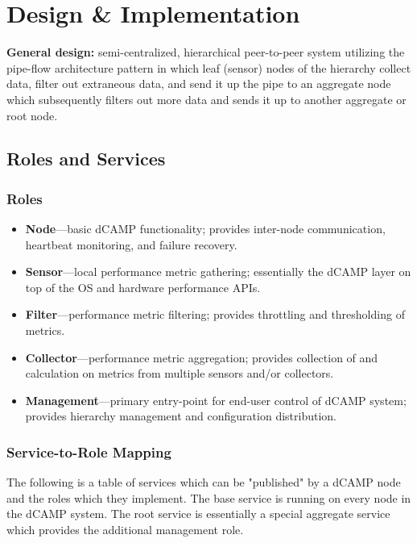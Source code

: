 \chapter{Design \& Implementation}
\label{design_implementation}

\textbf{General design:} semi-centralized, hierarchical peer-to-peer system utilizing the pipe-flow architecture pattern
in which leaf (sensor) nodes of the hierarchy collect data, filter out extraneous data, and send it up the pipe to an
aggregate node which subsequently filters out more data and sends it up to another aggregate or root node.

\section{\dcamp Roles and Services}
\subsection{Roles}

\begin{itemize}

\item \textbf{Node}---basic dCAMP functionality; provides inter-node communication, heartbeat monitoring, and failure
recovery. 

\item \textbf{Sensor}---local performance metric gathering; essentially the dCAMP layer on top of the OS and hardware
performance APIs. 

\item \textbf{Filter}---performance metric filtering; provides throttling and thresholding of metrics. 

\item \textbf{Collector}---performance metric aggregation; provides collection of and calculation on metrics from
multiple sensors and/or collectors. 

\item \textbf{Management}---primary entry-point for end-user control of dCAMP system; provides hierarchy management and
configuration distribution.

\end{itemize}

\subsection{Service-to-Role Mapping}

The following is a table of services which can be "published" by a dCAMP node and the roles which they implement. The
base service is running on every node in the dCAMP system. The root service is essentially a special aggregate service
which provides the additional management role. 

